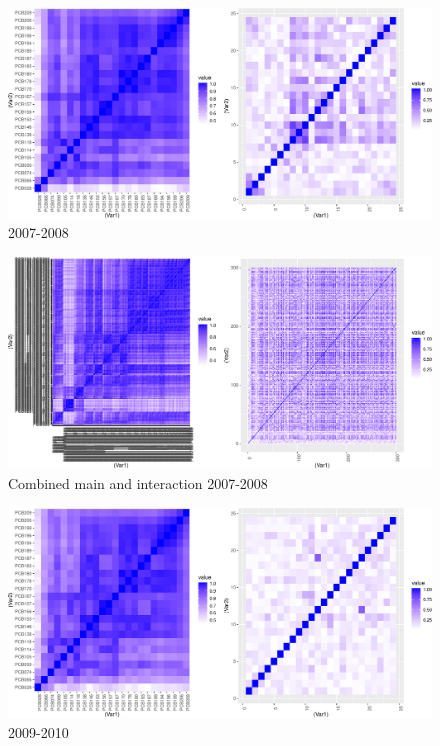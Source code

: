 \documentclass[]{article}
\begin{document}
\begin{figure}
\centering
\includegraphics{PCBs_covariance_files/figure-latex/unnamed-chunk-21-1.pdf}
\caption{2007-2008}
\end{figure}

\begin{figure}
\centering
\includegraphics{PCBs_covariance_files/figure-latex/unnamed-chunk-22-1.pdf}
\caption{Combined main and interaction 2007-2008}
\end{figure}

\begin{figure}
\centering
\includegraphics{PCBs_covariance_files/figure-latex/unnamed-chunk-23-1.pdf}
\caption{2009-2010}
\end{figure}
\end{document}
